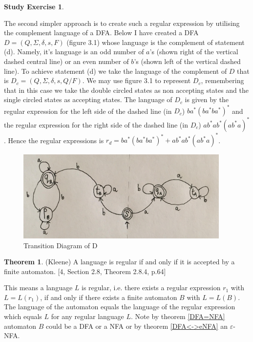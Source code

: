 \documentclass[a4paper,12pt]{report}
\theoremstyle{definition}
\newtheorem{exercise}{Study Exercise}[]
\newtheorem{theorem}{Theorem}[chapter]
\begin{document}
\begin{exercise}
\begin{itemize}
    The second simpler approach is to create such a regular expression by utilising the complement language of a DFA. Below I have created a DFA $D=(Q,\Sigma, \delta, s, F)$ (figure 3.1) whose language is the complement of statement (d). Namely, it's language is an odd number of $a$'s (shown right of the vertical dashed central line) or an even number of $b$'s (shown left of the vertical dashed line). To achieve statement (d) we take the language of the complement of $D$ that is $D_c=(Q,\Sigma,\delta,s,Q/F)$. We may use figure 3.1 to represent $D_c$, remembering that in this case we take the double circled states as non accepting states and the single circled states as accepting states. The language of $D_c$ is given by the regular expression for the left side of the dashed line (in $D_c$) $ba^*(ba^*ba^*)^*$ and the regular expression for the right side of the dashed line (in $D_c$) $ab^*ab^*(ab^*a)^*$. Hence the regular expressions is $r_d=ba^*(ba^*ba^*)^*+  ab^*ab^*(ab^*a)^*$.
    
    \begin{figure}[ht]
    \centering
    \includegraphics[width=400px]{figure1.9.jpg}
    \caption{Transition Diagram of D}
    \label{image-Figure1.9}
    \end{figure}
    \end{itemize}
\end{exercise}
    



\begin{theorem}(Kleene)
\label{Kleene}
A language is regular if and only if it is accepted by a finite automaton. [4, Section 2.8, Theorem 2.8.4, p.64]
\end{theorem}

This means a language $L$ is regular, i.e. there exists a regular expression $r_1$ with $L=L(r_1)$, if and only if there exists a finite automaton $B$ with $L=L(B)$. The language of the automaton equals the language of the regular expression which equals $L$ for any regular language $L$. Note by theorem \ref{DFA=NFA} automaton $B$ could be a DFA or a NFA or by theorem \ref{DFA<->eNFA} an $\varepsilon$-NFA.
\end{document}

